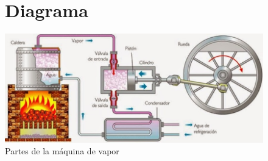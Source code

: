 \documentclass[12pt, letterpaper]{article}
\begin{document}
    
    \begin{figure}
        \section{Diagrama}
        \includegraphics[scale=0.75]{steammachine.jpg}
        \caption{Partes de la máquina de vapor} 

        
            
    
    
       
    \end{figure}
        
    
    
    
\end{document}
